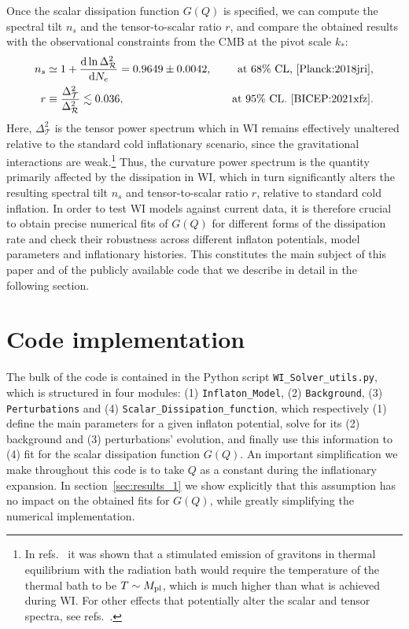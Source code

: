 \documentclass[a4paper,11pt]{article}
\begin{document}
Once the scalar dissipation function $G(Q)$ is specified, we can compute the spectral tilt $n_s$ and the tensor-to-scalar ratio $r$, and compare the obtained results with the observational constraints from the CMB at the pivot scale $k_*$: 
\begin{align}
    n_s&\simeq 1+\frac{{\rm d}\ln \Delta^2_{\mathcal{R}}}{{\rm d}N_e}= 0.9649\pm 0.0042,& \quad \text{at 68\% CL,~\cite{Planck:2018jri}} \label{eq:ns_Planck}, \\
   r &\equiv \frac{\Delta_{\mathcal{T}}^2}{\Delta^2_{\mathcal{R}}}\lesssim 0.036, & \quad \text{at 95\% CL.~\cite{BICEP:2021xfz}}. \label{eq:r_Planck}
\end{align}
Here, $\Delta_{\mathcal{T}}^2$ is the tensor power spectrum which in WI remains effectively unaltered relative to the standard cold inflationary scenario, since the gravitational interactions are weak.\footnote{In refs.~\cite{Bhattacharya:2006dm,Qiu:2021ytc} it was shown that a stimulated emission of gravitons in thermal equilibrium with the radiation bath  would require the temperature of the thermal bath to be $T \sim M_{\rm pl}$, which is much higher than what is achieved during WI. For other effects that potentially alter the scalar and tensor spectra, see refs.~\cite{Namba:2015gja,Peloso:2016gqs}. }  Thus, the curvature power spectrum is the quantity primarily affected by the dissipation in WI, which in turn significantly alters the resulting spectral tilt $n_s$ and tensor-to-scalar ratio $r$, relative to standard cold inflation. In order to test WI models against current data, it is therefore  crucial to obtain precise numerical fits of $G(Q)$ for different forms of the dissipation rate and check their robustness across different inflaton potentials, model parameters and inflationary histories. This constitutes the main subject of this paper and of the publicly available code that we describe in detail in the following section.

\section{Code implementation \label{sec:code}}

The bulk of the code is contained in the Python script \texttt{WI\_Solver\_utils.py}, which  is structured in four modules: (1) \texttt{Inflaton\_Model}, (2) \texttt{Background}, (3) \texttt{Perturbations} and (4) \texttt{Scalar\_Dissipation\_function}, which respectively (1) define the main parameters for a given inflaton potential, solve for its (2) background and (3) perturbations' evolution, and finally use this information to (4) fit for the scalar dissipation function $G(Q)$. An important simplification we make throughout this code is to take $Q$ as a constant during the inflationary expansion. In section~\ref{sec:results_1} we show explicitly that this assumption has no impact on the obtained fits for $G(Q)$, while greatly simplifying the numerical implementation.
\end{document}
